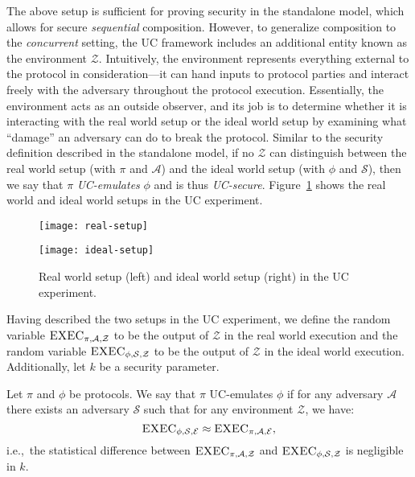 \documentclass{llncs}
\newcommand{\mc}[1]{\mathcal{{#1}}}
\begin{document}
The above setup is sufficient for proving security in the standalone model,
which allows for secure \emph{sequential} composition. However, to generalize
composition to the \emph{concurrent} setting, the UC framework includes an
additional entity known as the environment $\mc{Z}$. Intuitively, the
environment represents everything external to the protocol in consideration---it
can hand inputs to protocol parties and interact freely with the adversary throughout the
protocol execution. Essentially, the environment acts as an outside observer,
and its job is to determine whether it is interacting with the real world setup
or the ideal world setup by examining what ``damage'' an adversary can do to
break the protocol. Similar to the security definition described in the
standalone model, if no $\mc{Z}$ can distinguish between the real world setup
(with $\pi$ and $\mc{A}$) and the ideal world setup (with $\phi$ and $\mc{S}$),
then we say that $\pi$ \emph{UC-emulates} $\phi$ and is
thus \emph{UC-secure}. Figure~\ref{fig:uc-experiment} shows the real world and
ideal world setups in the UC experiment.

\begin{figure}[!htb]
\centering
\begin{minipage}{.5\textwidth}
  \centering
  \texttt{[image: real-setup]}
\end{minipage}%
\begin{minipage}{.5\textwidth}
  \centering
  \texttt{[image: ideal-setup]}
\end{minipage}
\caption{Real world setup (left) and ideal world setup (right) in the UC experiment.}
\label{fig:uc-experiment}
\end{figure}

Having described the two setups in the UC experiment, we define the random
variable $\textsc{EXEC}_{\pi, \mc{A}, \mc{Z}}$ to be the output of $\mc{Z}$ in
the real world execution and the random variable
$\textsc{EXEC}_{\phi, \mc{S}, \mc{Z}}$ to be the output of $\mc{Z}$ in the ideal
world execution. Additionally, let $k$ be a security parameter.

\begin{definition}
Let $\pi$ and $\phi$ be protocols. We say that $\pi$ UC-emulates $\phi$ if for
any adversary $\mc{A}$ there exists an
adversary $\mc{S}$ such that for any environment $\mc{Z}$, we have:
\begin{equation*}
\textsc{EXEC}_{\phi, \mc{S}, \mc{E}} \approx \textsc{EXEC}_{\pi, \mc{A}, \mc{E}},
\end{equation*}
\noindent i.e.,\ the statistical difference between
$\textsc{EXEC}_{\pi, \mc{A}, \mc{Z}}$ and $\textsc{EXEC}_{\phi, \mc{S}, \mc{Z}}$
is negligible in $k$.
\end{definition}
\end{document}

